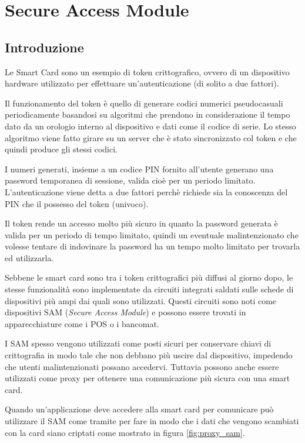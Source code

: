 \chapter{Secure Access Module}
\label{chapter3}

\section{Introduzione}
Le Smart Card sono un esempio di token crittografico, ovvero di un dispositivo hardware utilizzato per effettuare un'autenticazione (di solito a due fattori).

Il funzionamento del token è quello di generare codici numerici pseudocasuali periodicamente basandosi su algoritmi che prendono in considerazione il tempo dato da un orologio interno al dispositivo e dati come il codice di serie. Lo stesso algoritmo viene fatto girare su un server che è stato sincronizzato col token e che quindi produce gli stessi codici.

I numeri generati, insieme a un codice PIN fornito all'utente generano una password temporanea di sessione, valida cioè per un periodo limitato. L'autenticazione viene detta a due fattori perchè richiede sia la conoscenza del PIN che il possesso del token (univoco).

Il token rende un accesso molto più sicuro in quanto la password generata è valida per un periodo di tempo limitato, quindi un eventuale malintenzionato che volesse tentare di indovinare la password ha un tempo molto limitato per trovarla ed utilizzarla.
\cite{wiki_token}

Sebbene le smart card sono tra i token crittografici più diffusi al giorno dopo, le stesse funzionalità sono implementate da circuiti integrati saldati sulle schede di dispositivi più ampi dai quali sono utilizzati. Questi circuiti sono noti come dispositivi SAM (\textit{Secure Access Module}) e possono essere trovati in apparecchiature come i POS o i bancomat.

I SAM spesso vengono utilizzati come posti sicuri per conservare chiavi di crittografia in modo tale che non debbano più uscire dal dispositivo, impedendo che utenti malintenzionati possano accedervi. Tuttavia possono anche essere utilizzati come proxy per ottenere una comunicazione più sicura con una smart card.

Quando un'applicazione deve accedere alla smart card per comunicare può utilizzare il SAM come tramite per fare in modo che i dati che vengono scambiati con la card siano criptati come mostrato in figura \ref{fig:proxy_sam}.

